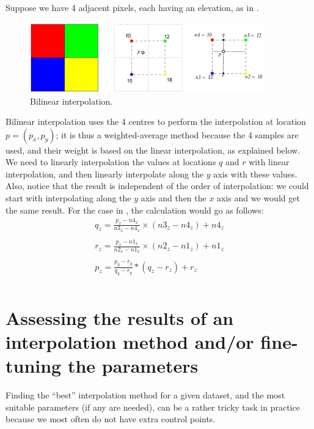 Suppose we have 4 adjacent pixels, each having an elevation, as in .
\begin{figure}
  \centering
  \includegraphics[width=0.9\textwidth]{figs/bilinear}
  \caption{Bilinear interpolation.} %
\end{figure}
Bilinear interpolation uses the 4 centres to perform the interpolation at location $p = (p_x, p_y)$; it is thus a weighted-average method because the 4 samples are used, and their weight is based on the linear interpolation, as explained below.
We need to linearly interpolation the values at locations $q$ and $r$ with linear interpolation, and then linearly interpolate along the $y$ axis with these values. 
Also, notice that the result is independent of the order of interpolation: we could start with interpolating along the $y$ axis and then the $x$ axis and we would get the same result. 
For the case in , the calculation would go as follows:
\[
  \begin{array}{l}
    q_z = \frac{p_x - n4_x}{n3_x - n4_x} \times (n3_z - n4_z) + n4_z \\
   \\
    r_z = \frac{p_x - n1_x}{n2_x - n1_x} \times (n2_z - n1_z) + n1_z \\
    \\
    p_z = \frac{p_y - r_y}{q_y - r_y} * (q_z - r_z) + r_z \\
  \end{array}
\]


%
\section[Assessing the results]{Assessing the results of an interpolation method and/or fine-tuning the parameters}

Finding the ``best'' interpolation method for a given dataset, and the most suitable parameters (if any are needed), can be a rather tricky task in practice because we most often do not have extra control points.

